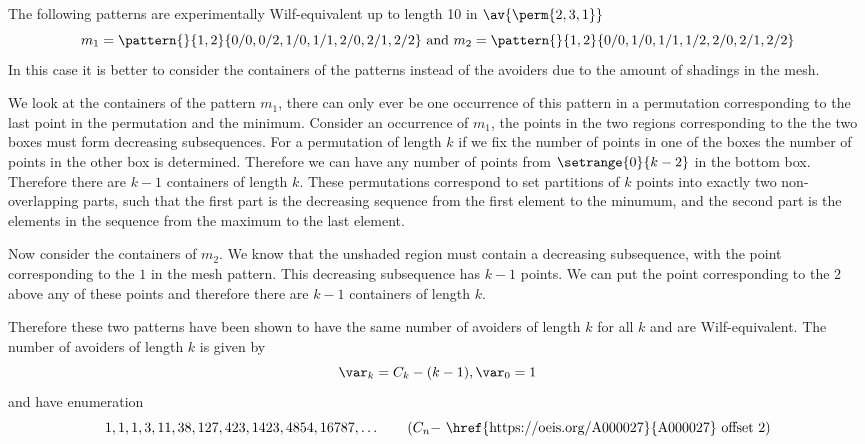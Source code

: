 \subsection{}
\nextvar
The following patterns are experimentally Wilf-equivalent up to length 10 in
\(\av{\perm{2,3,1}}\)
\begin{equation*}
    m_1 = \pattern{}{1,2}{0/0,0/2,
                    1/0,1/1,
                    2/0,2/1,2/2}
    \text{ and }
    m_2 = \pattern{}{1,2}{0/0,
                    1/0,1/1,1/2,
                    2/0,2/1,2/2}
\end{equation*}
In this case it is better to consider the containers of the patterns
instead of the avoiders due to the amount of shadings in the mesh.

We look at the containers of the pattern \(m_1\), there can only ever
be one occurrence of this pattern in a permutation corresponding to
the last point in the permutation and the minimum. Consider an occurrence of \(m_1\),
the points in the two regions corresponding to the the two boxes must form decreasing
subsequences.
For a permutation of length \(k\) if we fix the number of points in
one of the boxes the number of points in the other box is determined.
Therefore we can have any number of points from \(\setrange{0}{k-2}\)
in the bottom box. Therefore there are \(k-1\) containers of
length \(k\). These permutations correspond to set partitions of \(k\)
points into exactly two non-overlapping parts, such that the first part
is the decreasing sequence from the first element to the minumum, and
the second part is the elements in the sequence from the maximum to the last
element.

Now consider the containers of \(m_2\). We know that the unshaded region
must contain a decreasing subsequence, with the point corresponding to
the \(1\) in the mesh pattern. This decreasing subsequence has \(k-1\)
points. We can put the point corresponding to the \(2\) above any of these
points and therefore there are \(k-1\) containers of length \(k\).

Therefore these two patterns have been shown to have the same number of
avoiders of length \(k\) for all \(k\) and are Wilf-equivalent.
The number of avoiders of length \(k\) is given by
\begin{equation*}
  \var_k = C_k - (k-1), \var_0 = 1
\end{equation*}
and have enumeration
\begin{equation*}
    1, 1, 1, 3, 11, 38, 127, 423, 1423, 4854, 16787,\dotsc \tag{\(C_n -\) \href{https://oeis.org/A000027}{A000027} offset 2}
\end{equation*}

